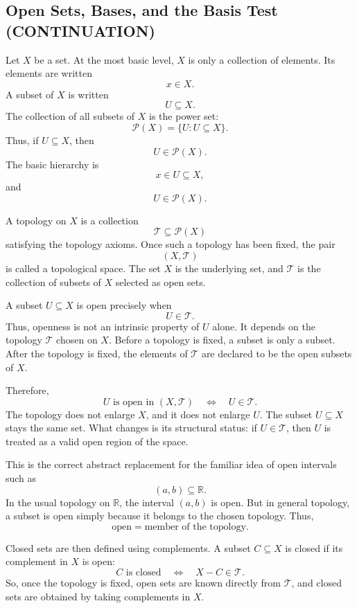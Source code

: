 \documentclass{article}
\begin{document}
	\subsection{Open Sets, Bases, and the Basis Test (CONTINUATION)}
	
	Let \(X\) be a set. At the most basic level, \(X\) is only a collection of elements. Its elements are written
	$$
	x\in X.
	$$
	A subset of \(X\) is written
	$$
	U\subseteq X.
	$$
	The collection of all subsets of \(X\) is the power set:
	$$
	\mathcal P(X)=\{U:U\subseteq X\}.
	$$
	Thus, if \(U\subseteq X\), then
	$$
	U\in\mathcal P(X).
	$$
	The basic hierarchy is
	$$
	x\in U\subseteq X,
	$$
	and
	$$
	U\in\mathcal P(X).
	$$
	
	A topology on \(X\) is a collection
	$$
	\mathcal T\subseteq\mathcal P(X)
	$$
	satisfying the topology axioms. Once such a topology has been fixed, the pair
	$$
	(X,\mathcal T)
	$$
	is called a topological space. The set \(X\) is the underlying set, and \(\mathcal T\) is the collection of subsets of \(X\) selected as open sets.
	
	A subset \(U\subseteq X\) is open precisely when
	$$
	U\in\mathcal T.
	$$
	Thus, openness is not an intrinsic property of \(U\) alone. It depends on the topology \(\mathcal T\) chosen on \(X\). Before a topology is fixed, a subset is only a subset. After the topology is fixed, the elements of \(\mathcal T\) are declared to be the open subsets of \(X\).
	
	Therefore,
	$$
	U\text{ is open in }(X,\mathcal T)
	\quad\Longleftrightarrow\quad
	U\in\mathcal T.
	$$
	The topology does not enlarge \(X\), and it does not enlarge \(U\). The subset \(U\subseteq X\) stays the same set. What changes is its structural status: if \(U\in\mathcal T\), then \(U\) is treated as a valid open region of the space.
	
	This is the correct abstract replacement for the familiar idea of open intervals such as
	$$
	(a,b)\subseteq\mathbb R.
	$$
	In the usual topology on \(\mathbb R\), the interval \((a,b)\) is open. But in general topology, a subset is open simply because it belongs to the chosen topology. Thus,
	$$
	\text{open}=\text{member of the topology}.
	$$
	
	Closed sets are then defined using complements. A subset \(C\subseteq X\) is closed if its complement in \(X\) is open:
	$$
	C\text{ is closed}
	\quad\Longleftrightarrow\quad
	X-C\in\mathcal T.
	$$
	So, once the topology is fixed, open sets are known directly from \(\mathcal T\), and closed sets are obtained by taking complements in \(X\).
	
\end{document}

